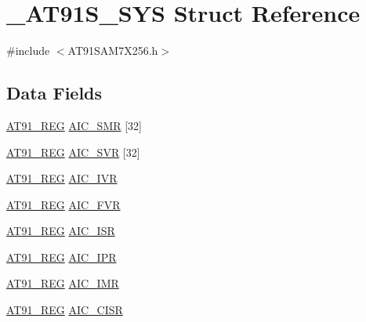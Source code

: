\hypertarget{struct__AT91S__SYS}{\section{\-\_\-\-A\-T91\-S\-\_\-\-S\-Y\-S Struct Reference}
\label{struct__AT91S__SYS}
}


{\ttfamily \#include $<$A\-T91\-S\-A\-M7\-X256.\-h$>$}

\subsection*{Data Fields}
\begin{DoxyCompactItemize}
\item 
\hyperlink{GCC_2ARM7__AT91SAM7S_2AT91SAM7X256_8h_a712ad5a1ac1bd02f3e95a7526c283ce1}{A\-T91\-\_\-\-R\-E\-G} \hyperlink{struct__AT91S__SYS_a6b2dc25fefb6a43c8839d3a0ba85a408}{A\-I\-C\-\_\-\-S\-M\-R} \mbox{[}32\mbox{]}
\item 
\hyperlink{GCC_2ARM7__AT91SAM7S_2AT91SAM7X256_8h_a712ad5a1ac1bd02f3e95a7526c283ce1}{A\-T91\-\_\-\-R\-E\-G} \hyperlink{struct__AT91S__SYS_a1b583e863c3624110adb15846ef78427}{A\-I\-C\-\_\-\-S\-V\-R} \mbox{[}32\mbox{]}
\item 
\hyperlink{GCC_2ARM7__AT91SAM7S_2AT91SAM7X256_8h_a712ad5a1ac1bd02f3e95a7526c283ce1}{A\-T91\-\_\-\-R\-E\-G} \hyperlink{struct__AT91S__SYS_a24e5233d7ec9c2daed8dc29aeac22ce1}{A\-I\-C\-\_\-\-I\-V\-R}
\item 
\hyperlink{GCC_2ARM7__AT91SAM7S_2AT91SAM7X256_8h_a712ad5a1ac1bd02f3e95a7526c283ce1}{A\-T91\-\_\-\-R\-E\-G} \hyperlink{struct__AT91S__SYS_a2d92f48e5b842c2c77f134b979fd2bc7}{A\-I\-C\-\_\-\-F\-V\-R}
\item 
\hyperlink{GCC_2ARM7__AT91SAM7S_2AT91SAM7X256_8h_a712ad5a1ac1bd02f3e95a7526c283ce1}{A\-T91\-\_\-\-R\-E\-G} \hyperlink{struct__AT91S__SYS_aed4a9f739e52edf7c7815f458799b6e4}{A\-I\-C\-\_\-\-I\-S\-R}
\item 
\hyperlink{GCC_2ARM7__AT91SAM7S_2AT91SAM7X256_8h_a712ad5a1ac1bd02f3e95a7526c283ce1}{A\-T91\-\_\-\-R\-E\-G} \hyperlink{struct__AT91S__SYS_af420a7282f407323cc7d796699c0720b}{A\-I\-C\-\_\-\-I\-P\-R}
\item 
\hyperlink{GCC_2ARM7__AT91SAM7S_2AT91SAM7X256_8h_a712ad5a1ac1bd02f3e95a7526c283ce1}{A\-T91\-\_\-\-R\-E\-G} \hyperlink{struct__AT91S__SYS_ae0ed0c0a3132843b4059265489ee2063}{A\-I\-C\-\_\-\-I\-M\-R}
\item 
\hyperlink{GCC_2ARM7__AT91SAM7S_2AT91SAM7X256_8h_a712ad5a1ac1bd02f3e95a7526c283ce1}{A\-T91\-\_\-\-R\-E\-G} \hyperlink{struct__AT91S__SYS_a571a3b496f349c04d930abbb45adf942}{A\-I\-C\-\_\-\-C\-I\-S\-R}

\end{DoxyCompactItemize}
